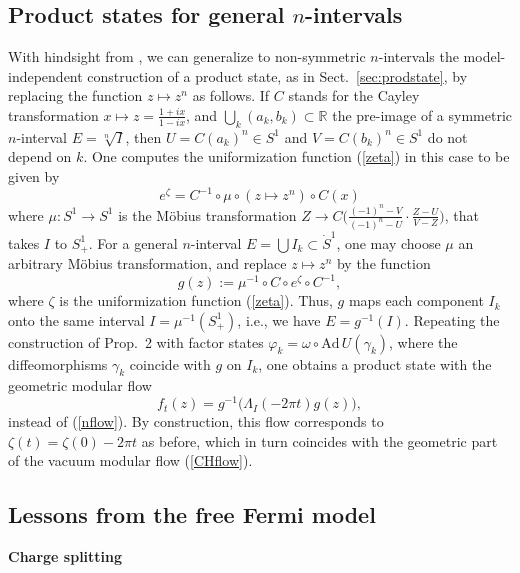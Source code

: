 \documentclass[12pt]{article}
\def \RR {{\mathbb R}}
\def \Sdot {\dot S^1}
\def\Ad{\mathrm{Ad}\,}
\def\inv{^{-1}}
\def\be{\begin{equation}} \def\bea{\begin{eqnarray}}
\def\ee{\end{equation}}\def\ea{\end{array}}
\begin{document}
\subsection{Product states for general $n$-intervals} \label{sec:genprod}

With hindsight from \cite{CH}, we can generalize to non-symmetric
$n$-intervals the model-independent construction of a product state,
as in Sect.\ \ref{sec:prodstate}, by replacing the function 
$z\mapsto z^n$ as follows. If $C$ stands for the Cayley transformation
$x\mapsto z= 
\frac{1+ix}{1-ix}$, and $\bigcup_k(a_k,b_k)\subset\RR$ the pre-image of
a symmetric $n$-interval $E=\sqrt[n]I$, then $U=C(a_k)^n\in S^1$ and
$V=C(b_k)^n\in S^1$ do not depend on $k$. One computes the
uniformization function (\ref{zeta}) in this case to be given by 
\be 
   e^\zeta = C\inv\circ\mu\circ (z\mapsto z^n) \circ C(x)
\ee
where $\mu:S^1\to S^1$ is the Möbius transformation $Z\to
C\Big(\frac{(-1)^n-V}{(-1)^n-U}\cdot\frac{Z-U}{V-Z}\Big)$,
that takes $I$ to $S^1_+$. For a general $n$-interval 
$E=\bigcup I_k\subset \Sdot$, one may choose $\mu$ an
arbitrary Möbius transformation, and replace $z\mapsto z^n$ by the
function  
\be 
\label{g} 
  g(z):= \mu\inv\circ C\circ e^\zeta\circ C\inv,
\ee
where $\zeta$ is the uniformization function (\ref{zeta}). Thus, $g$
maps each component $I_k$ onto the same interval $I=\mu\inv(S^1_+)$,
i.e., we have $E=g\inv(I)$. Repeating the construction of Prop.\ 2
with factor states $\varphi_k=\omega\circ\Ad U(\gamma_k)$, where the
diffeomorphisms $\gamma_k$ coincide with $g$ on $I_k$, one obtains a
product state with the geometric modular flow 
\be
   f_t(z)=g\inv\big(\Lambda_I(-2\pi t)g(z)\big),
\ee
instead of (\ref{nflow}). By construction, this flow corresponds to
$\zeta(t)=\zeta(0)-2\pi t$ as before, which in turn coincides with the
geometric part of the vacuum modular flow (\ref{CHflow}). 
 
\subsection{Lessons from the free Fermi model}
\label{sec:less}

{\bf Charge splitting}
\end{document}

